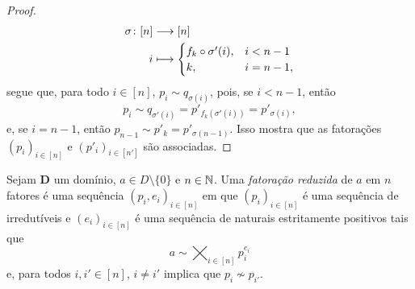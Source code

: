 \begin{proof}
	\begin{align*}
	{\sigma}\colon {[n]} &\longrightarrow {[n]} \\{i} &\longmapsto \begin{cases}
		f_k \circ \sigma'(i), & i < n-1 \\
		k, & i = n-1,
		\end{cases}
	\end{align*}
segue que, para todo $i \in [n]$, $p_i \sim q_{\sigma(i)}$, pois, se $i<n-1$, então
	\begin{equation*}
	p_i \sim q_{\sigma'(i)} = p'_{f_k(\sigma'(i))} = p'_{\sigma(i)},
	\end{equation*}
e, se $i = n-1$, então $p_{n-1} \sim p'_k = p'_{\sigma(n-1)}$. Isso mostra que as fatorações $(p_i)_{i \in [n]}$ e $(p'_i)_{i \in [n']}$ são associadas.
\end{proof}

\begin{definition}
Sejam $\bm D$ um domínio, $a \in D \setminus \{0\}$ e $n \in \mathbb{N}$. Uma \emph{fatoração reduzida} de $a$ em $n$ fatores é uma sequência $(p_i,e_i)_{i \in [n]}$ em que $(p_i)_{i \in [n]}$ é uma sequência de irredutíveis e $(e_i)_{i \in [n]}$ é uma sequência de naturais estritamente positivos tais que
	\begin{equation*}
	a \sim \bigtimes_{i \in [n]} p_i^{e_i}
	\end{equation*}
e, para todos $i,i' \in [n]$, $i \neq i'$ implica que $p_i \not\sim p_{i'}$.
\end{definition}

